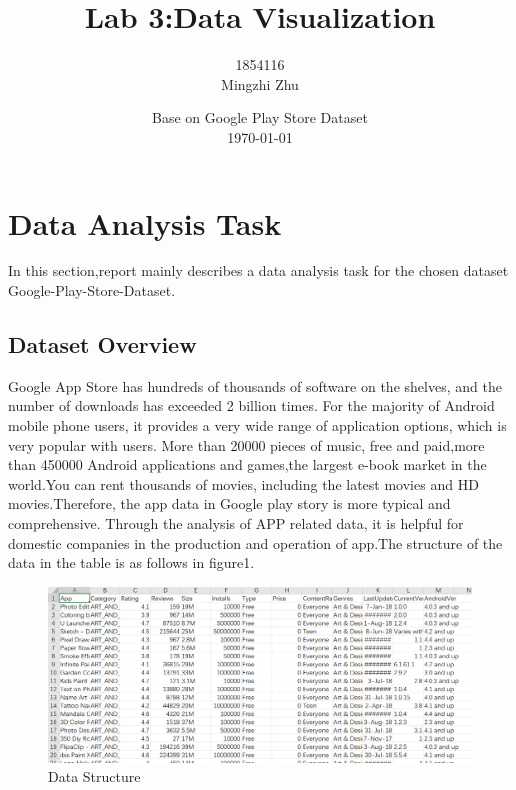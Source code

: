 \documentclass{hci}
\title{Lab 3:Data Visualization}
\author{1854116 
	\\Mingzhi Zhu}
\date{Base on Google Play Store Dataset\\\today}
\begin{document}
\maketitle
\tableofcontents
\newpage
\section{Data Analysis Task}
In this section,report mainly describes a data analysis task for the chosen dataset Google-Play-Store-Dataset. 
\subsection{Dataset Overview}
Google App Store has hundreds of thousands of software on the shelves, and the number of downloads has exceeded 2 billion times. For the majority of Android mobile phone users, it provides a very wide range of application options, which is very popular with users. More than 20000 pieces of music, free and paid,more than 450000 Android applications and games,the largest e-book market in the world.You can rent thousands of movies, including the latest movies and HD movies.Therefore, the app data in Google play story is more typical and comprehensive. Through the analysis of APP related data, it is helpful for domestic companies in the production and operation of app.The structure of the data in the table is as follows in figure1.
\begin{figure}[htbp]
	\centering
	\includegraphics[width=0.8\linewidth]{figures/overview}
	\caption{Data Structure}
	\label{fig:overview}
\end{figure}
\end{document}
